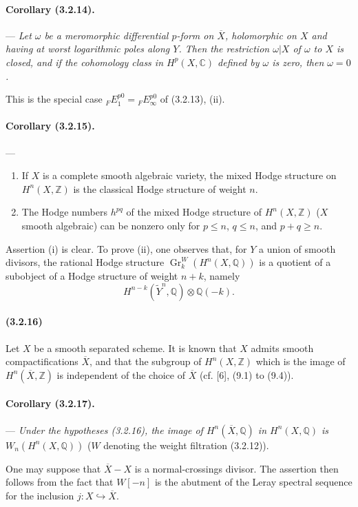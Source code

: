 \documentclass[10pt]{article}
\newcommand{\C}{\mathbb C}
\newcommand{\Q}{\mathbb Q}
\newcommand{\Z}{\mathbb Z}
\newcommand{\Gr}{\operatorname{Gr}}
\begin{document}
\paragraph{Corollary (3.2.14).} --- {\itshape Let $\omega$ be a meromorphic differential $p$-form on $\overline X$, holomorphic on $X$ and having at worst logarithmic poles along $Y$. Then the restriction $\omega|X$ of $\omega$ to $X$ is closed, and if the cohomology class in $H^p(X,\C)$ defined by $\omega$ is zero, then $\omega=0$.}

This is the special case ${}_FE_1^{p0}={}_FE_\infty^{p0}$ of (3.2.13), (ii).

\paragraph{Corollary (3.2.15).} --- {\itshape
\begin{enumerate}[label=(\roman*),font=\itshape]
\item If $X$ is a complete smooth algebraic variety, the mixed Hodge structure on $H^n(X,\Z)$ is the classical Hodge structure of weight $n$.
\item The Hodge numbers $h^{pq}$ of the mixed Hodge structure of $H^n(X,\Z)$ ($X$ smooth algebraic) can be nonzero only for $p\le n$, $q\le n$, and $p+q\ge n$.
\end{enumerate}}
Assertion (i) is clear. To prove (ii), one observes that, for $Y$ a union of smooth divisors, the rational Hodge structure $\Gr_k^W(H^n(X,\Q))$ is a quotient of a subobject of a Hodge structure of weight $n+k$, namely
\[
H^{n-k}(\widetilde Y^n,\Q)\otimes\Q(-k).
\]

\paragraph{(3.2.16)} Let $X$ be a smooth separated scheme. It is known that $X$ admits smooth compactifications $\overline X$, and that the subgroup of $H^n(X,\Z)$ which is the image of $H^n(\overline X,\Z)$ is independent of the choice of $\overline X$ (cf. [6], (9.1) to (9.4)).

\paragraph{Corollary (3.2.17).} --- {\itshape Under the hypotheses (3.2.16), the image of $H^n(\overline X,\Q)$ in $H^n(X,\Q)$ is} $W_n(H^n(X,\Q))$ ($W$ denoting the weight filtration (3.2.12)).

One may suppose that $\overline X-X$ is a normal-crossings divisor. The assertion then follows from the fact that $W[-n]$ is the abutment of the Leray spectral sequence for the inclusion $j:X\hookrightarrow\overline X$.
\end{document}
